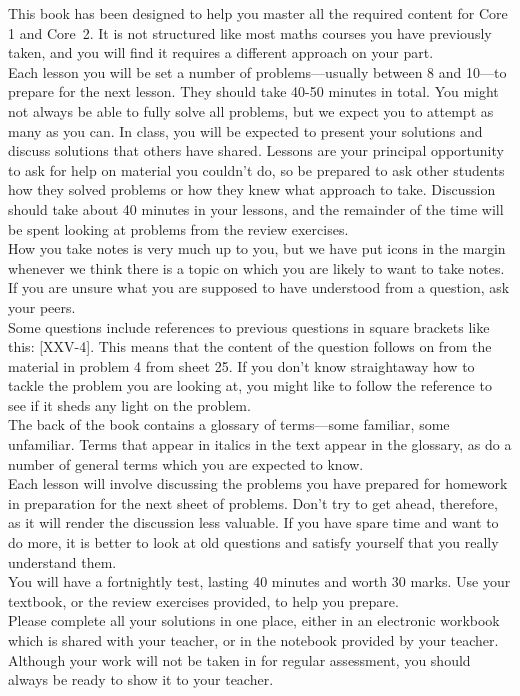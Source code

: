\documentclass{Welly_Workbook}
\begin{document}
\noindent This book has been designed to help you master all the required content for Core 1 and \mbox{Core 2}. It is not structured like most maths courses you have previously taken, and you will find it requires a different approach on your part. \\ \linebreak
Each lesson you will be set a number of problems---usually between 8 and 10---to prepare for the next lesson. They should take 40-50 minutes in total. You might not always be able to fully solve all problems, but we expect you to attempt as many as you can. In class, you will be expected to present your solutions and discuss solutions that others have shared. Lessons are your principal opportunity to ask for help on material you couldn't do, so be prepared to ask other students how they solved problems or how they knew what approach to take. Discussion should take about 40 minutes in your lessons, and the remainder of the time will be spent looking at problems from the review exercises.\\ \linebreak
\notebook[-4.6]How you take notes is very much up to you, but we have put icons in the margin whenever we think there is a topic on which you are likely to want to take notes. If you are unsure what you are supposed to have understood from a question, ask your peers.\\ \linebreak
Some questions include references to previous questions in square brackets like this: \mbox{[XXV-4]}. This means that the content of the question follows on from the material in problem 4 from sheet 25. If you don't know straightaway how to tackle the problem you are looking at, you might like to follow the reference to see if it sheds any light on the problem.\\ \linebreak
The back of the book contains a glossary of terms---some familiar, some unfamiliar. Terms that appear in italics in the text appear in the glossary, as do a number of general terms which you are expected to know.\\ \linebreak
Each lesson will involve discussing the problems you have prepared for homework in preparation for the next sheet of problems. Don't try to get ahead, therefore, as it will render the discussion less valuable. If you have spare time and want to do more, it is better to look at old questions and satisfy yourself that you really understand them.\\ \linebreak
You will have a fortnightly test, lasting 40 minutes and worth 30 marks. Use your textbook, or the review exercises provided, to help you prepare. \\ \linebreak
Please complete all your solutions in one place, either in an electronic workbook which is shared with your teacher, or in the notebook provided by your teacher. Although your work will not be taken in for regular assessment, you should always be ready to show it to your teacher.
\end{document}
